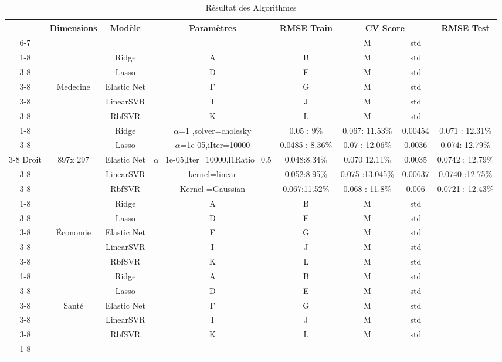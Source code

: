 \documentclass[11pt]{article}
\begin{document}
 
\begin{table}[!htbp]
	\caption{Résultat des Algorithmes }
	\begin{center}
		\begin{tabular}{|c|c|c|c|c|c|c|c|}
			\hline
			\multirow{6}{*}{} Faculté & Dimensions &Modèle&Paramètres &RMSE Train &\multicolumn{2}{c|}{CV Score}&RMSE Test  \\
			\cline{6-7}
			&&&&&M&std& \\
			\cline{1-8}
			&&Ridge&A&B&M&std& \\
			\cline{3-8}
			&&Lasso&D&E&M&std& \\
			\cline{3-8}
			&Medecine&Elastic Net&F&G&M&std& \\
			\cline{3-8}
			&&LinearSVR&I&J&M&std& \\
			\cline{3-8}
			&&RbfSVR&K&L&M&std& \\
			\cline{1-8}
			\multirow{5}{*}{}
			&&Ridge&${\alpha}$=1 ,solver=cholesky&0.05 : 9\% &0.067: 11.53\%& 0.00454&0.071 : 12.31\% \\
			\cline{3-8}
			&&Lasso&${\alpha}$=1e-05,iIter=10000&0.0485 : 8.36\%&0.07 : 12.06\%&0.0036&  0.074: 12.79\%\\
			\cline{3-8}
			Droit&897x 297&Elastic Net&${\alpha}$=1e-05,Iter=10000,l1Ratio=0.5&0.048:8.34\%&0.070
			12.11\%
			&0.0035& 0.0742 : 12.79\%\\
			\cline{3-8}
			&&LinearSVR&kernel=linear&0.052:8.95\%&0.075 :13.045\%&0.00637&0.0740 :12.75\%\\
			\cline{3-8}
			&&RbfSVR&Kernel =Gaussian&0.067:11.52\%&0.068 : 11.8\% &0.006& 0.0721 : 12.43\%\\
			\cline{1-8}
			\hline
				\multirow{5}{*}{}
			&&Ridge&A&B&M&std& \\
			\cline{3-8}
			&&Lasso&D&E&M&std& \\
			\cline{3-8}
			&Économie&Elastic Net&F&G&M&std& \\
			\cline{3-8}
			&&LinearSVR&I&J&M&std& \\
			\cline{3-8}
			&&RbfSVR&K&L&M&std& \\
			\cline{1-8}
				\multirow{5}{*}{}
			&&Ridge&A&B&M&std& \\
			\cline{3-8}
			&&Lasso&D&E&M&std& \\
			\cline{3-8}
			&Santé&Elastic Net&F&G&M&std& \\
			\cline{3-8}
			&&LinearSVR&I&J&M&std& \\
			\cline{3-8}
			&&RbfSVR&K&L&M&std& \\
			\cline{1-8}
				\multirow{5}{*}{}

\end{tabular}
\end{center}
\end{table}
\end{document}
